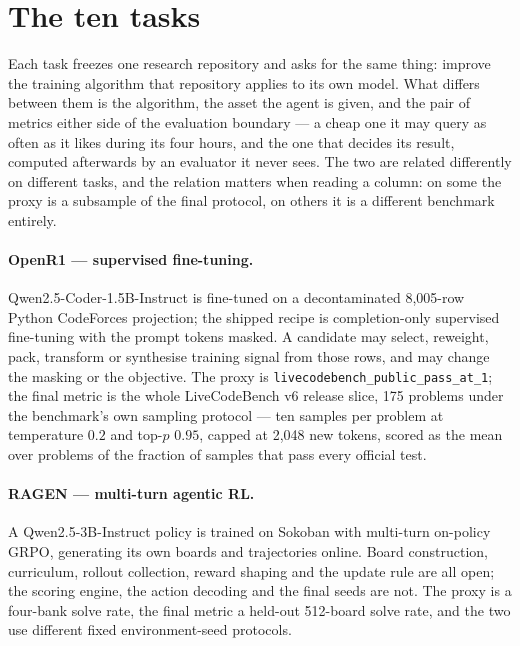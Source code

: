\section{The ten tasks}
\label{app:tasks}

Each task freezes one research repository and asks for the same thing: improve the training
algorithm that repository applies to its own model. What differs between them is the algorithm, the
asset the agent is given, and the pair of metrics either side of the evaluation boundary --- a cheap
one it may query as often as it likes during its four hours, and the one that decides its result,
computed afterwards by an evaluator it never sees. The two are related differently on different
tasks, and the relation matters when reading a column: on some the proxy is a subsample of the final
protocol, on others it is a different benchmark entirely.

\paragraph{OpenR1 --- supervised fine-tuning.}
Qwen2.5-Coder-1.5B-Instruct is fine-tuned on a decontaminated 8,005-row Python CodeForces
projection; the shipped recipe is completion-only supervised fine-tuning with the prompt tokens
masked. A candidate may select, reweight, pack, transform or synthesise training signal from those
rows, and may change the masking or the objective. The proxy is
\texttt{livecodebench\_public\_pass\_at\_1}; the final metric is the whole LiveCodeBench v6 release
slice, 175 problems under the benchmark's own sampling protocol --- ten samples per problem at
temperature $0.2$ and top-$p$ $0.95$, capped at 2,048 new tokens, scored as the mean over problems
of the fraction of samples that pass every official test.

\paragraph{RAGEN --- multi-turn agentic RL.}
A Qwen2.5-3B-Instruct policy is trained on Sokoban with multi-turn on-policy GRPO, generating its
own boards and trajectories online. Board construction, curriculum, rollout collection, reward
shaping and the update rule are all open; the scoring engine, the action decoding and the final
seeds are not. The proxy is a four-bank solve rate, the final metric a held-out 512-board solve
rate, and the two use different fixed environment-seed protocols.

